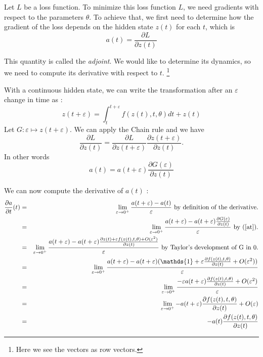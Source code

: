 \documentclass[10pt,a4paper]{article}
\theoremstyle{definition}
\theoremstyle{definition}
\theoremstyle{definition}
\begin{document}
Let $L$ be a loss function. To minimize this loss function $L$, we need gradients with respect to the parameters $\theta$. To achieve that, we first need to determine how the gradient of the loss depends on the hidden state $z(t)$ for each $t$, which is
\begin{equation}
a(t)= \frac{\partial L}{\partial z(t)}
\end{equation}

This quantity is called the \textit{adjoint}. We would like to determine its dynamics, so we need to compute its derivative with respect to $t$. \footnote{Here we see the vectors as row vectors.}

With a continuous hidden state, we can write the transformation after an $\varepsilon$ change in time as :
\begin{equation}
\label{zteps}
z(t+\varepsilon) = \int^{t+\varepsilon}_{t} f(z(t),t,\theta) dt + z(t)
\end{equation}
Let $ G : \varepsilon \mapsto z(t+\varepsilon)$. We can apply the Chain rule and we have 
\begin{equation*}
\frac{\partial L}{\partial z(t)} = \frac{\partial L}{\partial z(t+\varepsilon)} \frac{\partial z(t+\varepsilon)}{\partial z(t)}.
\end{equation*}
In other words 
\begin{equation}
\label{at}
a(t) = a(t+\varepsilon)\frac{\partial G(\varepsilon)}{\partial z(t)}
\end{equation}


We can now compute the derivative of $a(t)$ :
\begin{eqnarray*}
\frac{\partial a}{\partial t}(t) &=& \lim_{\varepsilon \rightarrow 0^+} \frac{a(t+\varepsilon) - a(t)}{\varepsilon} \text{ by definition of the derivative.}\\
&=& \lim_{\varepsilon \rightarrow 0^+} \frac{a(t+\varepsilon) - a(t+\varepsilon)\frac{\partial G(\varepsilon)}{\partial z(t)}}{\varepsilon} \text{ by (\ref{at}).}\\
&=& \lim_{\varepsilon \rightarrow 0^+} \frac{a(t+\varepsilon) - a(t+\varepsilon)\frac{\partial z(t) + \varepsilon f(z(t),t,\theta) + O(\varepsilon^2)}{\partial z(t)}}{\varepsilon}  \text{ by Taylor's development of G in 0.} \\
&=& \lim_{\varepsilon \rightarrow 0^+} \frac{a(t+\varepsilon) - a(t+\varepsilon)(\mathds{1} + \varepsilon \frac{\partial f(z(t),t,\theta)} {\partial z(t)}+ O(\varepsilon^2))}{\varepsilon}\\
&=& \lim_{\varepsilon \rightarrow 0^+} \frac{-\varepsilon a(t+\varepsilon) \frac{\partial f(z(t),t,\theta)} {\partial z(t)}+ O(\varepsilon^2)}{\varepsilon}\\
&=& \lim_{\varepsilon \rightarrow 0^+} - a(t+\varepsilon) \frac{\partial f(z(t),t,\theta)} {\partial z(t)}+ O(\varepsilon)\\
&=& -a(t)\frac{\partial f(z(t),t,\theta)} {\partial z(t)}
\end{eqnarray*}
\end{document}

